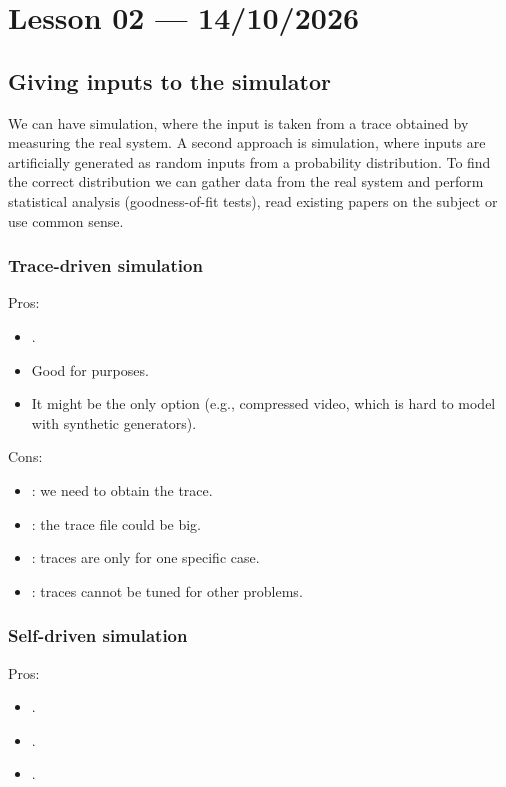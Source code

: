 \section{Lesson 02 --- 14/10/2026}

\subsection{Giving inputs to the simulator}

We can have  simulation, where the input is taken from a trace obtained by measuring the real system. A second approach is  simulation, where inputs are artificially generated as random inputs from a probability distribution. To find the correct distribution we can gather data from the real system and perform statistical analysis (goodness-of-fit tests), read existing papers on the subject or use common sense.

\subsubsection{Trace-driven simulation}
Pros:
\begin{itemize}
\item {}.
\item Good for  purposes.
\item It might be the only option (e.g., compressed video, which is hard to model with synthetic generators).
\end{itemize}

Cons:
\begin{itemize}
\item {}: we need to obtain the trace.
\item {}: the trace file could be big.
\item {}: traces are only for one specific case.
\item {}: traces cannot be tuned for other problems.
\end{itemize}

\subsubsection{Self-driven simulation}
Pros:
\begin{itemize}
\item {}.
\item {}.
\item {}.
\end{itemize}


